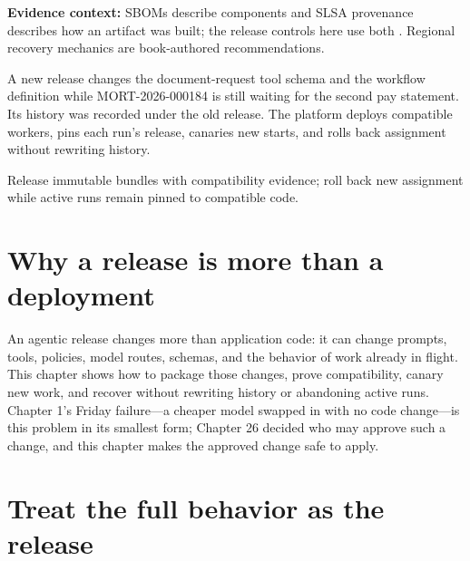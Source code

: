 
\begin{bookquote}

\textbf{Evidence context:} SBOMs describe components and SLSA provenance describes how an artifact was built; the release controls here use both \textbf{}. Regional recovery mechanics are book-authored recommendations.

\end{bookquote}

\begin{bookcallout}
A new release changes the document-request tool schema and the workflow definition while MORT-2026-000184 is still waiting for the second pay statement. Its history was recorded under the old release. The platform deploys compatible workers, pins each run's release, canaries new starts, and rolls back assignment without rewriting history.
\end{bookcallout}

\begin{bookcallout}
Release immutable bundles with compatibility evidence; roll back new assignment while active runs remain pinned to compatible code.
\end{bookcallout}

\section{Why a release is more than a deployment}

An agentic release changes more than application code: it can change prompts, tools, policies, model routes, schemas, and the behavior of work already in flight. This chapter shows how to package those changes, prove compatibility, canary new work, and recover without rewriting history or abandoning active runs. Chapter 1's Friday failure—a cheaper model swapped in with no code change—is this problem in its smallest form; Chapter 26 decided who may approve such a change, and this chapter makes the approved change safe to apply.\par

\section{Treat the full behavior as the release}


